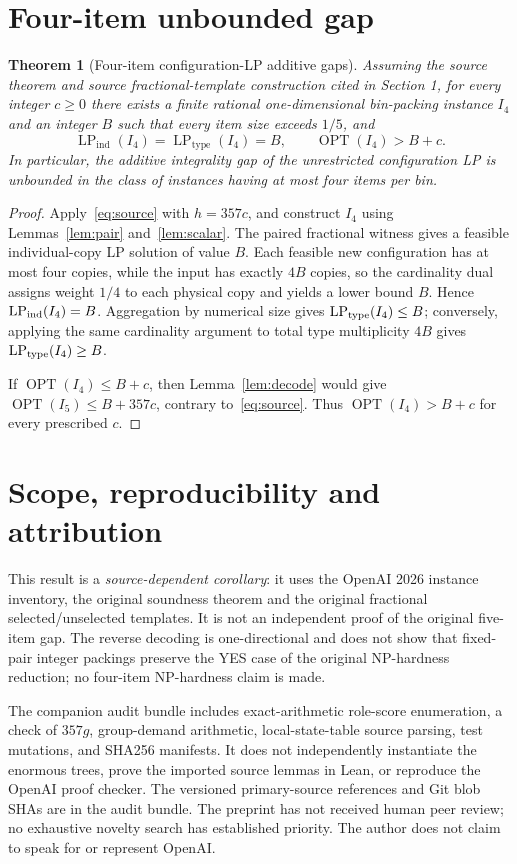 \documentclass[11pt,a4paper]{article}
\newtheorem{theorem}{Theorem}
\newcommand{\OPT}{\operatorname{OPT}}
\newcommand{\LP}{\operatorname{LP}}
\begin{document}
\section{Four-item unbounded gap}
\begin{theorem}[Four-item configuration-LP additive gaps]\label{thm:gap}
Assuming the source theorem and source fractional-template construction cited in Section 1, for every integer $c\ge0$ there exists a finite rational one-dimensional bin-packing instance $I_4$ and an integer $B$ such that every item size exceeds $1/5$, and
\[
\LP_{\mathrm{ind}}(I_4)=\LP_{\mathrm{type}}(I_4)=B,
\qquad\OPT(I_4)>B+c.
\]
In particular, the additive integrality gap of the unrestricted configuration LP is unbounded in the class of instances having at most four items per bin.
\end{theorem}
\begin{proof}
Apply~\eqref{eq:source} with $h=357c$, and construct $I_4$ using Lemmas~\ref{lem:pair} and~\ref{lem:scalar}. The paired fractional witness gives a feasible individual-copy LP solution of value $B$. Each feasible new configuration has at most four copies, while the input has exactly $4B$ copies, so the cardinality dual assigns weight $1/4$ to each physical copy and yields a lower bound $B$. Hence $\LP_{\rm ind}(I_4)=B$. Aggregation by numerical size gives $\LP_{\rm type}(I_4)\le B$; conversely, applying the same cardinality argument to total type multiplicity $4B$ gives $\LP_{\rm type}(I_4)\ge B$.

If $\OPT(I_4)\le B+c$, then Lemma~\ref{lem:decode} would give $\OPT(I_5)\le B+357c$, contrary to~\eqref{eq:source}. Thus $\OPT(I_4)>B+c$ for every prescribed $c$.
\end{proof}

\section{Scope, reproducibility and attribution}
This result is a \emph{source-dependent corollary}: it uses the OpenAI 2026 instance inventory, the original soundness theorem and the original fractional selected/unselected templates. It is not an independent proof of the original five-item gap. The reverse decoding is one-directional and does not show that fixed-pair integer packings preserve the YES case of the original NP-hardness reduction; no four-item NP-hardness claim is made.

The companion audit bundle includes exact-arithmetic role-score enumeration, a check of $357g$, group-demand arithmetic, local-state-table source parsing, test mutations, and SHA256 manifests. It does not independently instantiate the enormous trees, prove the imported source lemmas in Lean, or reproduce the OpenAI proof checker. The versioned primary-source references and Git blob SHAs are in the audit bundle. The preprint has not received human peer review; no exhaustive novelty search has established priority. The author does not claim to speak for or represent OpenAI.
\end{document}
